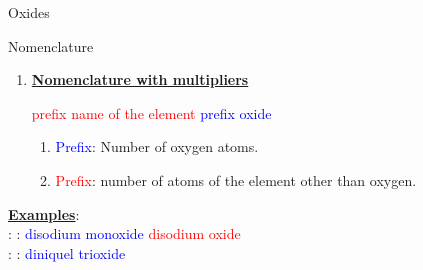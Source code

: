 \documentclass{beamer}
\newcommand*{\numberballmDarkTeal}{\protect\cnumero{\arabic*}{mDarkTeal}}
\newcommand{\nline}[1][6pt]{\\[#1]}
\begin{document}
\begin{frame}[t]{ Oxides}
    \begin{alertblock}{\Large Nomenclature}
        \vspace*{2mm}
        \begin{enumerate}[label=\numberballmDarkTeal]
            \item \textbf{\uline{Nomenclature with multipliers}}
                  \begin{center}
                    \textcolor{red}{prefix} \textcolor{red}{name of the element} 
                    \textcolor{blue}{prefix} \textcolor{blue}{oxide} 
                  \end{center}

                  \begin{enumerate}[label=\textcolor{red}{$\bullet$}]
                      \item \textcolor{blue}{Prefix}: Number of oxygen atoms.
                      \item \textcolor{red}{Prefix}: number of atoms of the element other than oxygen.
                  \end{enumerate}
        \end{enumerate}
        \textbf{\uline{Examples}}:\nline

         : : \textcolor{blue}{disodium monoxide} \ch{->} \textcolor{red}{disodium oxide}\nline

         : : \textcolor{blue}{diniquel trioxide}
    \end{alertblock}
\end{frame}




\end{document}
